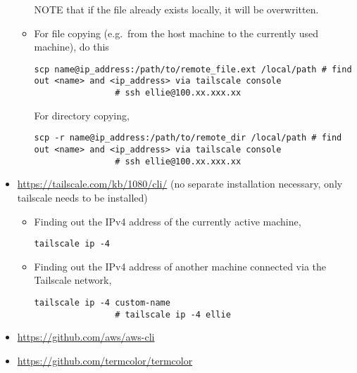 \documentclass[12pt, a4paper]{article}
\numberwithin{equation}{section}
\theoremstyle{definition}
\theoremstyle{definition}
\begin{document}
\begin{itemize}
\begin{itemize}
			NOTE that if the file already exists locally, it will be overwritten.
			
			\item For file copying (e.g.~from the host machine to the currently used machine), do this
			
			\begin{lstlisting}[style=mystylepython, label=alg:tailscale__scp_file, xleftmargin=\parindent]
				scp name@ip_address:/path/to/remote_file.ext /local/path # find out <name> and <ip_address> via tailscale console
				# ssh ellie@100.xx.xxx.xx
			\end{lstlisting}
			
			For directory copying, 
			
			\begin{lstlisting}[style=mystylepython, label=alg:tailscale__scp_dir, xleftmargin=\parindent]
				scp -r name@ip_address:/path/to/remote_dir /local/path # find out <name> and <ip_address> via tailscale console
				# ssh ellie@100.xx.xxx.xx
			\end{lstlisting}
			
		\end{itemize}
	
		\item \url{https://tailscale.com/kb/1080/cli/} (no separate installation necessary, only tailscale needs to be installed)
		
		\begin{itemize}
			\item Finding out the IPv4 address of the currently active machine,
			
			\begin{lstlisting}[style=mystylepython, label=alg:tailscale_ip, xleftmargin=\parindent]
				tailscale ip -4 
			\end{lstlisting}
			
			\item Finding out the IPv4 address of another machine connected via the Tailscale network,
			
			\begin{lstlisting}[style=mystylepython, label=alg:tailscale_ip, xleftmargin=\parindent]
				tailscale ip -4 custom-name
				# tailscale ip -4 ellie
			\end{lstlisting}
			
		\end{itemize}
		
		\item \url{https://github.com/aws/aws-cli}
		
		\item \url{https://github.com/termcolor/termcolor}
		
	\end{itemize}
\end{document}
